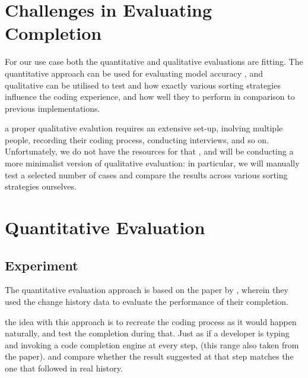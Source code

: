 \section{Challenges in Evaluating Completion}
\label{sec:Evaluation-Challenges}

For our use case both the quantitative and qualitative evaluations are fitting. The quantitative approach can be used for evaluating model accuracy , and qualitative can be utilised to test  and how exactly various sorting strategies influence the coding experience, and how well they  to perform in comparison to previous implementations.

 a proper qualitative evalution requires an extensive set-up,  inolving multiple people, recording their coding process, conducting interviews, and so on. Unfortunately, we do not have the resources for that , and will be conducting a more minimalist version of qualitative evaluation: in particular, we will manually test a selected number of cases and compare the results across various sorting strategies ourselves.

\section{Quantitative Evaluation}
\label{sec:Evaluation-Quantitative}
\subsection{Experiment}
The quantitative evaluation approach  is based on the paper by \cite{Robb08a}, wherein they used the change history data to evaluate the performance of their completion.

 the idea with this approach is to recreate the coding process as it would happen naturally, and test the completion during that. Just as if a developer is typing and invoking a code completion engine at every step,  (this range also taken from the \cite{Robb08a} paper).   and compare whether the result suggested at that step matches the one that followed in real history. 


